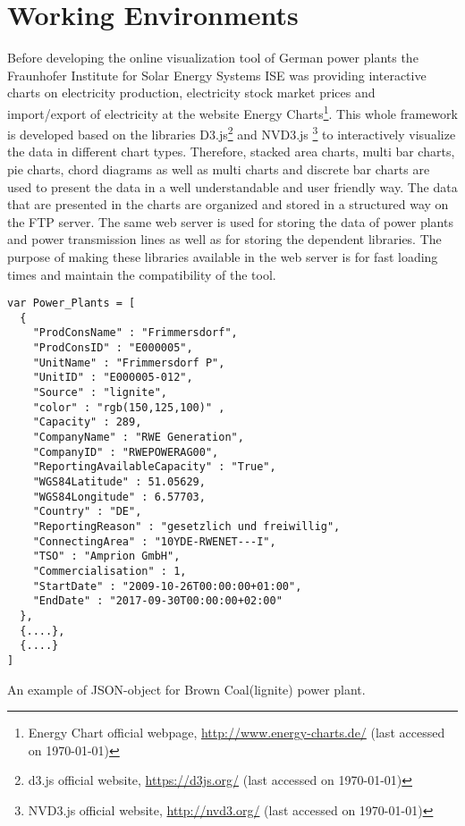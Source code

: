\section{Working Environments}

Before developing the online visualization tool of German power plants the Fraunhofer Institute for Solar Energy Systems ISE was providing interactive charts on electricity production, electricity stock market prices and import/export of electricity at the website Energy Charts\footnote{Energy Chart official webpage, \url{http://www.energy-charts.de/} (last accessed on {\today})}. This whole framework is developed based on the libraries D3.js\footnote{d3.js official website, \url{https://d3js.org/} (last accessed on {\today})}  and NVD3.js \footnote{NVD3.js official website, \url{http://nvd3.org/} (last accessed on {\today})} to interactively visualize the data in different chart types. Therefore, stacked area charts, multi bar charts, pie charts, chord diagrams as well as multi charts and discrete bar charts are used to present the data in a well understandable and user friendly way. The data that are presented in the charts are organized and stored in a structured way on the FTP server. The same web server is used for storing the data of power plants and power transmission lines as well as for storing the dependent libraries. The purpose of making these libraries available in the web server is for fast loading times and maintain the compatibility of the tool.

\begin{Listing}
\begin{lstlisting}
var Power_Plants = [
  { 
    "ProdConsName" : "Frimmersdorf",
    "ProdConsID" : "E000005",
    "UnitName" : "Frimmersdorf P",
    "UnitID" : "E000005-012",
    "Source" : "lignite",
    "color" : "rgb(150,125,100)" ,
    "Capacity" : 289,
    "CompanyName" : "RWE Generation",
    "CompanyID" : "RWEPOWERAG00",
    "ReportingAvailableCapacity" : "True",
    "WGS84Latitude" : 51.05629,
    "WGS84Longitude" : 6.57703,
    "Country" : "DE",
    "ReportingReason" : "gesetzlich und freiwillig",
    "ConnectingArea" : "10YDE-RWENET---I",
    "TSO" : "Amprion GmbH",
    "Commercialisation" : 1,
    "StartDate" : "2009-10-26T00:00:00+01:00",
    "EndDate" : "2017-09-30T00:00:00+02:00"
  },
  {....},
  {....}
]
\end{lstlisting}
\caption{An example of JSON-object for Brown Coal(lignite) power plant.}
\label{lst:pp-json}
\end{Listing}

